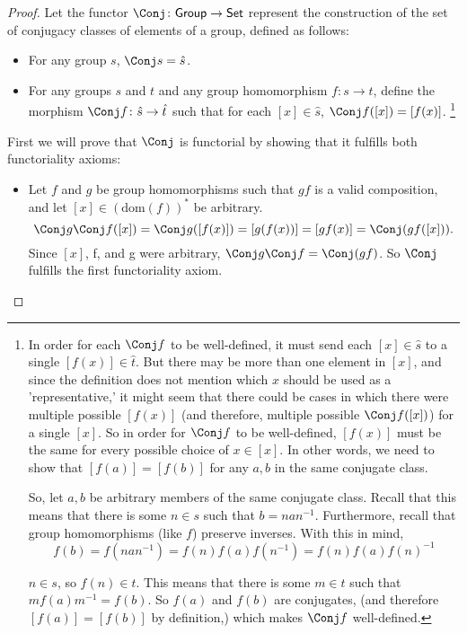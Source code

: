 \documentclass[main.tex]{subfiles}
\begin{document}
\begin{proof}
	Let the functor \(\Conj\colon\mathsf{Group\to Set}\) represent the construction of
	the set of conjugacy classes of elements of a group, defined as follows:
	\begin{itemize}
		\item For any group \(s\), \(\Conj s = \hat{s}\).

		\item For any groups \(s\) and \(t\) and any group homomorphism
			\(f\colon s\to t\), define the morphism \(\Conj f\colon \hat{s}\to \hat{t}\)
			such that for each \([x]\in \hat{s}\), \(\Conj f([x]) = [f(x)]\).%
			\footnote{
				In order for each \(\Conj f\) to be well-defined,
				it must send each \([x]\in \hat{s}\) to a single \([f(x)]\in \hat{t}\). But there
				may be more than one element in \([x]\), and since the definition does not
				mention which \(x\) should be used as a 'representative,' it might seem that
				there could be cases in which there were multiple possible \([f(x)]\) (and
				therefore, multiple possible \(\Conj f([x])\)) for a single \([x]\). So in order
				for \(\Conj f\) to be well-defined, \([f(x)]\) must be the same for every
				possible choice of \(x\in [x]\). In other words, we need to show that
				\([f(a)] = [f(b)]\) for any \(a, b\) in the same conjugate class.

				So, let \(a, b\) be arbitrary members of the same conjugate class. Recall
				that this means that there is some \(n\in s\) such that \(b = nan^{-1}\).
				Furthermore, recall that group homomorphisms (like \(f\)) preserve inverses.
				With this in mind, \[f(b) = f(nan^{-1}) = f(n)f(a)f(n^{-1}) =
				f(n)f(a)f(n)^{-1}\]

				\(n\in s\), so \(f(n)\in t\). This means that there is some \(m\in t\) such
				that \(mf(a)m^{-1} = f(b)\). So \(f(a)\) and \(f(b)\) are conjugates, (and
				therefore \([f(a)] = [f(b)]\) by definition,) which makes
				\(\Conj f\)
			well-defined.}
		\end{itemize}

		First we will prove that \(\Conj \) is functorial by showing that it fulfills
		both functoriality axioms:
		\begin{itemize}
			\item Let \(f\) and \(g\) be group homomorphisms such that \(gf\) is a
				valid composition, and let \([x]\in(\textrm{dom}(f))^*\) be
				arbitrary. \[\Conj g\Conj f([x])=\Conj
				g([f(x)])=[g(f(x))]=[gf(x)]=\Conj (gf([x])).\]
				Since \([x]\), f, and g were arbitrary, \(\Conj g\Conj f = \Conj
				(gf)\). So \(\Conj \)
				fulfills the first functoriality axiom.


\end{itemize}
\end{proof}
\end{document}

